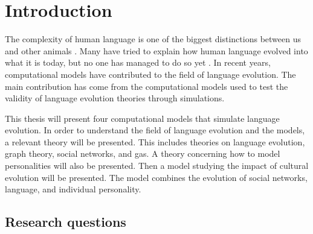 \acresetall
\chapter{Introduction}
The complexity of human language is one of the biggest distinctions between us and other animals \citep{hauser2002faculty}. Many have tried to explain how human language evolved into what it is today, but no one has managed to do so yet \citep{chomsky1986knowledge, pinker1990natural, muller1861theoretical}. In recent years, computational models have contributed to the field of language evolution. The main contribution has come from the computational models used to test the validity of language evolution theories through simulations.

This thesis will present four computational models that simulate language evolution. In order to understand the field of language evolution and the models, a relevant theory will be presented. This includes theories on language evolution, graph theory, social networks, and \acp{ga}. A theory concerning how to model personalities will also be presented. Then a model studying the impact of cultural evolution will be presented. The model combines the evolution of social networks, language, and individual personality.


\section{Research questions}
\begin{centering}
    \begin{enumerate}
    \end{enumerate}
\end{centering}

